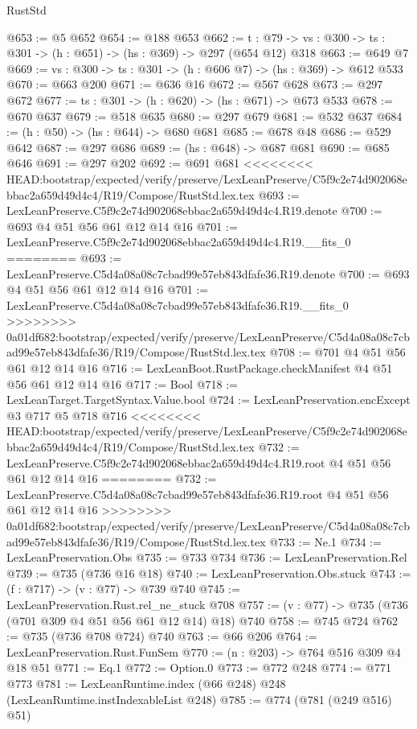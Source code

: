 \begin{lexlean}{RustStd}
\begin{coremodule}
{\begin{coremodule}
@653 := @5 @652
@654 := @188 @653
@662 := {t : @79} -> {vs : @300} -> {ts : @301} -> (h : @651) -> (hs : @369) -> @297 (@654 @12) @318
@663 := @649 @7
@669 := {vs : @300} -> {ts : @301} -> (h : @606 @7) -> (hs : @369) -> @612 @533
@670 := @663 @200
@671 := @636 @16
@672 := @567 @628
@673 := @297 @672
@677 := {ts : @301} -> (h : @620) -> (hs : @671) -> @673 @533
@678 := @670 @637
@679 := @518 @635
@680 := @297 @679
@681 := @532 @637
@684 := (h : @50) -> (hs : @644) -> @680 @681
@685 := @678 @48
@686 := @529 @642
@687 := @297 @686
@689 := (hs : @648) -> @687 @681
@690 := @685 @646
@691 := @297 @202
@692 := @691 @681
<<<<<<<< HEAD:bootstrap/expected/verify/preserve/LexLeanPreserve/C5f9c2e74d902068ebbac2a659d49d4c4/R19/Compose/RustStd.lex.tex
@693 := LexLeanPreserve.C5f9c2e74d902068ebbac2a659d49d4c4.R19.denote
@700 := @693 @4 @51 @56 @61 @12 @14 @16
@701 := LexLeanPreserve.C5f9c2e74d902068ebbac2a659d49d4c4.R19.__fits_0
========
@693 := LexLeanPreserve.C5d4a08a08c7cbad99e57eb843dfafe36.R19.denote
@700 := @693 @4 @51 @56 @61 @12 @14 @16
@701 := LexLeanPreserve.C5d4a08a08c7cbad99e57eb843dfafe36.R19.__fits_0
>>>>>>>> 0a01df682:bootstrap/expected/verify/preserve/LexLeanPreserve/C5d4a08a08c7cbad99e57eb843dfafe36/R19/Compose/RustStd.lex.tex
@708 := @701 @4 @51 @56 @61 @12 @14 @16
@716 := LexLeanBoot.RustPackage.checkManifest @4 @51 @56 @61 @12 @14 @16
@717 := Bool
@718 := LexLeanTarget.TargetSyntax.Value.bool
@724 := LexLeanPreservation.encExcept @3 @717 @5 @718 @716
<<<<<<<< HEAD:bootstrap/expected/verify/preserve/LexLeanPreserve/C5f9c2e74d902068ebbac2a659d49d4c4/R19/Compose/RustStd.lex.tex
@732 := LexLeanPreserve.C5f9c2e74d902068ebbac2a659d49d4c4.R19.root @4 @51 @56 @61 @12 @14 @16
========
@732 := LexLeanPreserve.C5d4a08a08c7cbad99e57eb843dfafe36.R19.root @4 @51 @56 @61 @12 @14 @16
>>>>>>>> 0a01df682:bootstrap/expected/verify/preserve/LexLeanPreserve/C5d4a08a08c7cbad99e57eb843dfafe36/R19/Compose/RustStd.lex.tex
@733 := Ne.{1}
@734 := LexLeanPreservation.Obs
@735 := @733 @734
@736 := LexLeanPreservation.Rel
@739 := @735 (@736 @16 @18)
@740 := LexLeanPreservation.Obs.stuck
@743 := (f : @717) -> (v : @77) -> @739 @740
@745 := LexLeanPreservation.Rust.rel_ne_stuck @708
@757 := (v : @77) -> @735 (@736 (@701 @309 @4 @51 @56 @61 @12 @14) @18) @740
@758 := @745 @724
@762 := @735 (@736 @708 @724) @740
@763 := @66 @206
@764 := LexLeanPreservation.Rust.FunSem
@770 := (n : @203) -> @764 @516 @309 @4 @18 @51
@771 := Eq.{1}
@772 := Option.{0}
@773 := @772 @248
@774 := @771 @773
@781 := LexLeanRuntime.index (@66 @248) @248 (LexLeanRuntime.instIndexableList @248)
@785 := @774 (@781 (@249 @516) @51)

\end{coremodule}}
\end{coremodule}
\end{lexlean}
